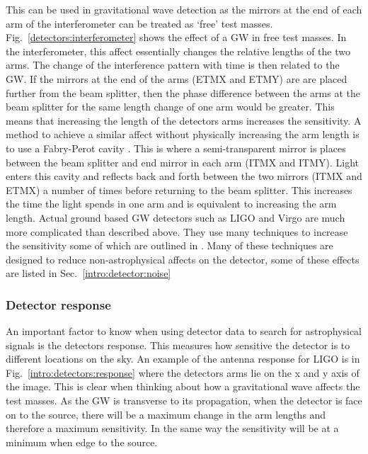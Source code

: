 This can be used in gravitational wave detection as the mirrors at the end of each arm of the interferometer can be treated as `free' test masses.
Fig.~\ref{detectors:interferometer} shows the effect of a \ac{GW} in free test masses.
In the interferometer, this affect essentially changes the relative lengths of the two arms.
The change of the interference pattern with time is then related to the \ac{GW}.
If the mirrors at the end of the arms (ETMX and ETMY) are are placed further from the beam splitter, then the phase difference between the arms at the beam splitter for the same length change of one arm would be greater. 
This means that increasing the length of the detectors arms increases the sensitivity. 
A method to achieve a similar affect without physically increasing the arm length is to use a Fabry-Perot cavity \citep{aasi2015AdvancedLIGO}.
This is where a semi-transparent mirror is places between the beam splitter and end mirror in each arm (ITMX and ITMY).
Light enters this cavity and reflects back and forth between the two mirrors (ITMX and ETMX) a number of times before returning to the beam splitter.
This increases the time the light spends in one arm and is equivalent to increasing the arm length.
Actual ground based \ac{GW} detectors such as \ac{LIGO} \citep{abbott2009LIGOLaser} and Virgo \citep{acernese2015AdvancedVirgo} are much more complicated than described above.
They use many techniques to increase the sensitivity some of which are outlined in \citep{aasi2015AdvancedLIGO,abbott2009LIGOLaser}.
Many of these techniques are designed to reduce non-astrophysical affects on the detector, some of these effects are listed in Sec.~\ref{intro:detector:noise}


\subsubsection{Detector response}

An important factor to know when using detector data to search for astrophysical signals is the detectors response.
This measures how sensitive the detector is to different locations on the sky.
An example of the antenna response for \ac{LIGO} is in Fig.~\ref{intro:detectors:response} where the detectors arms lie on the x and y axis of the image.
This is clear when thinking about how a gravitational wave affects the test masses. 
As the \ac{GW} is transverse to its propagation, when the detector is face on to the source, there will be a maximum change in the arm lengths and therefore a maximum sensitivity. 
In the same way the sensitivity will be at a minimum when edge to the source.

